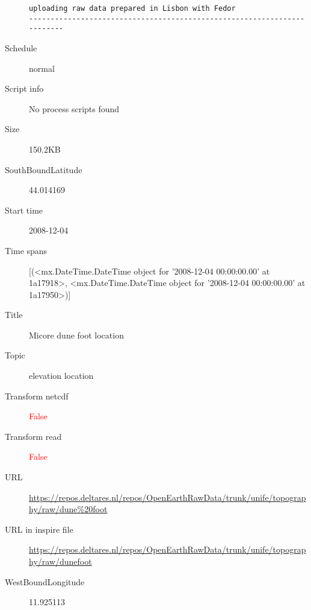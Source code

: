 \documentclass[9]{report}
\begin{document}
\begin{description}
\begin{verbatim}
uploading raw data prepared in Lisbon with Fedor
------------------------------------------------------------------------

\end{verbatim}
  \item[Schedule] normal
  \item[Script info] No process scripts found
  \item[Size] 150.2KB
  \item[SouthBoundLatitude] 44.014169
  \item[Start time] 2008-12-04
  \item[Time spans] [(<mx.DateTime.DateTime object for '2008-12-04 00:00:00.00' at 1a17918>, <mx.DateTime.DateTime object for '2008-12-04 00:00:00.00' at 1a17950>)]
  \item[Title]  Micore dune foot location 
  \item[Topic] elevation location
  \item[Transform netcdf] \textcolor{red}{False}
  \item[Transform read] \textcolor{red}{False}
  \item[URL] \href{https://repos.deltares.nl/repos/OpenEarthRawData/trunk/unife/topography/raw/dune\%20foot}{https://repos.deltares.nl/repos/OpenEarthRawData/trunk/unife/topography/raw/dune\%20foot}
  \item[URL in inspire file] \href{https://repos.deltares.nl/repos/OpenEarthRawData/trunk/unife/topography/raw/dunefoot}{https://repos.deltares.nl/repos/OpenEarthRawData/trunk/unife/topography/raw/dunefoot}
  \item[WestBoundLongitude] 11.925113
\end{description}
\end{document}
